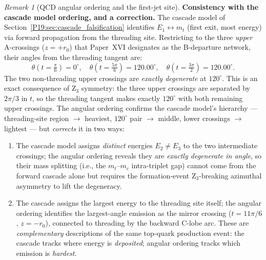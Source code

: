 \documentclass[11pt,a4paper]{article}
\theoremstyle{definition}\newtheorem{definition}[theorem]{Definition}
\theoremstyle{remark}
\newtheorem{remark}[theorem]{Remark}
\begin{document}
\begin{remark}[QCD angular ordering and the first-jet site]
\textbf{Consistency with the cascade model ordering, and a correction.}
The cascade model of Section~\ref{P19:sec:cascade_falsification}
identifies $E_1\leftrightarrow m_t$ (first exit, most energy) via
forward propagation from the threading site.  Restricting to the
three \emph{upper} A-crossings ($z=+r_0$) that Paper~XVI designates
as the B-departure network, their angles from the threading tangent
are:
\begin{equation}
  \theta(t=\tfrac{\pi}{6}) = 0^\circ,
  \quad
  \theta(t=\tfrac{5\pi}{6}) = 120.00^\circ,
  \quad
  \theta(t=\tfrac{3\pi}{2}) = 120.00^\circ.
  \label{P19:eq:upper_crossing_angles}
\end{equation}
The two non-threading upper crossings are \emph{exactly degenerate}
at $120^\circ$.  This is an exact consequence of Z$_3$ symmetry: the
three upper crossings are separated by $2\pi/3$ in $t$, so the
threading tangent makes exactly $120^\circ$ with both remaining
upper crossings.  The angular ordering confirms the cascade model's
hierarchy --- threading-site region $\to$ heaviest, $120^\circ$
pair $\to$ middle, lower crossings $\to$ lightest --- but
\emph{corrects} it in two ways:
\begin{enumerate}[noitemsep]
\item The cascade model assigns \emph{distinct} energies $E_2\neq E_3$
  to the two intermediate crossings; the angular ordering reveals they
  are \emph{exactly degenerate in angle}, so their mass splitting
  (i.e., the $m_t$--$m_c$ intra-triplet gap) cannot come from the
  forward cascade alone but requires the formation-event Z$_3$-breaking
  azimuthal asymmetry to lift the degeneracy.
\item The cascade assigns the largest energy to the threading site itself;
  the angular ordering identifies the largest-angle emission as the mirror
  crossing ($t=11\pi/6$, $z=-r_0$), connected to threading by the
  backward C-lobe arc.  These are \emph{complementary} descriptions of
  the same top-quark production event: the cascade tracks where energy
  is \emph{deposited}; angular ordering tracks which emission is
  \emph{hardest}.
\end{enumerate}


\end{remark}
\end{document}
